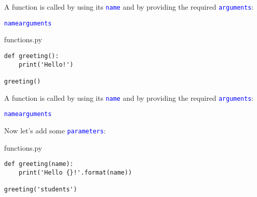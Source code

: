 \documentclass[aspectratio=1610,slidestop]{beamer}
\newcommand{\decl}[1]{\textcolor{blue}{\lstinline{#1}}}
\begin{document}
\begin{pframe}
 A function is called by using its \decl{name} and by providing the required
 \decl{arguments}:
 \begin{pythondeclaration}
  \decl{name}\emp{(}\decl{arguments}\emp{)}
 \end{pythondeclaration}
 \vspace{0.1cm}
 \begin{minipage}[t]{0.47\textwidth}
  \begin{pythonfile}{functions.py}
   \begin{verbatim}
def greeting():
    print('Hello!')

greeting()
   \end{verbatim}
  \end{pythonfile}
 \end{minipage}\qquad
 \begin{minipage}[t]{0.47\textwidth}
 \vspace{-2.55cm}
 \begin{terminal}
 \end{terminal}
 \end{minipage}
\end{pframe}


\begin{pframe}
 A function is called by using its \decl{name} and by providing the required
 \decl{arguments}:
 \begin{pythondeclaration}
  \decl{name}\emp{(}\decl{arguments}\emp{)}
 \end{pythondeclaration}
 Now let's add some \decl{parameters}:
 \vspace{0.1cm}

 \begin{minipage}[t]{0.49\textwidth}
  \begin{pythonfile}{functions.py}
   \begin{verbatim}
def greeting(name):
    print('Hello {}!'.format(name))

greeting('students')
   \end{verbatim}
  \end{pythonfile}
 \end{minipage}\qquad
 \begin{minipage}[t]{0.47\textwidth}
 \vspace{-2.55cm}
 \begin{terminal}
 \end{terminal}
 \end{minipage}
\end{pframe}
\end{document}
